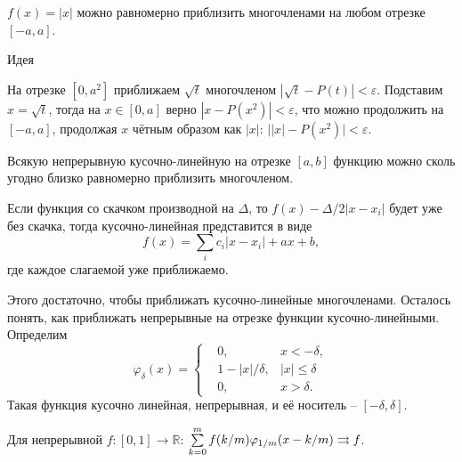 
\begin{to_lem}
    $f(x) = |x|$ можно равномерно приблизить многочленами на любом отрезке $[-a,a]$.
\end{to_lem}

\begin{uproof}
Идея 
\end{uproof}

\begin{uproof}
    На отрезке $[0, a^2]$ приближаем $\sqrt{t}$ многочленом $|\sqrt{t} - P(t)| < \varepsilon$. Подставим $x = \sqrt{t}$, тогда на $x \in [0, a]$ верно $|x - P(x^2)| < \varepsilon$, что можно продолжить на $[-a, a]$, продолжая $x$ чётным образом как $|x|$: $\big| |x| - P(x^2) \bigg| < \varepsilon$. 
\end{uproof}


\begin{to_thr}
    Всякую непрерывную кусочно-линейную на отрезке $[a, b]$ функцию можно сколь угодно близко равномерно приблизить многочленом.
\end{to_thr}

\begin{uproof}
Если функция со скачком производной на $\Delta$, то $f(x) - \Delta/2 |x-x_i|$ будет уже без скачка, тогда кусочно-линейная представится в виде
\begin{equation*}
    f(x) = \sum_i c_i |x - x_i | + a x + b,
\end{equation*}
где каждое слагаемой уже приближаемо. 
\end{uproof}

Этого достаточно, чтобы приближать кусочно-линейные многочленами. Осталось понять, как приближать непрерывные на отрезке функции  кусочно-линейными. Определим
\begin{equation*}
    \varphi_\delta (x) = \left\{\begin{aligned}
        &0, & x < - \delta, \\
        & 1 - |x|/\delta, &|x| \leq \delta \\ 
        &0, & x > \delta.
    \end{aligned}\right.
\end{equation*}
Такая функция кусочно линейная, непрерывная, и её носитель -- $[-\delta, \delta]$.


\begin{to_lem}
    Для непрерывной $f \colon [0,1] \to \mathbb{R}$: $\sum\limits_{k = 0}^{m} f(k/m) \varphi_{1/m} (x - k/m) \rightrightarrows f$.
\end{to_lem}


